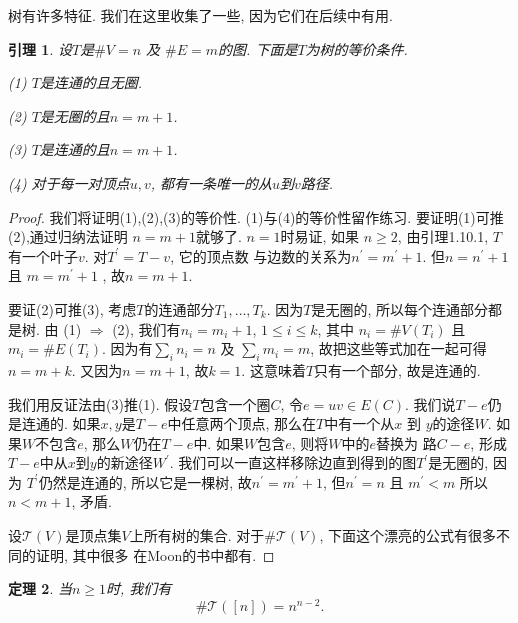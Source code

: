 \documentclass{ctexbook}
\newtheorem{thm}{定理}[section]
\newtheorem{lem}[thm]{引理}
\begin{document}
树有许多特征. 我们在这里收集了一些, 因为它们在后续中有用.
      \begin{lem}
     	设$T$是$\# V=n$ 及 $\# E=m$的图. 下面是$T$为树的等价条件.

     	\noindent(1) $T$是连通的且无圈.

     	\noindent(2) $T$是无圈的且$n=m+1$.

        \noindent(3) $T$是连通的且$n=m+1$.

     	\noindent(4) 对于每一对顶点$u, v$, 都有一条唯一的从$u$到$v$路径.
     \end{lem}
     \begin{proof}
     	我们将证明(1),(2),(3)的等价性. (1)与(4)的等价性留作练习. 要证明(1)可推(2),通过归纳法证明
     	$n=m+1$就够了.  $n=1$时易证, 如果 $n \geqslant 2$, 由引理1.10.1, $T$有一个叶子$v$. 对$T^{\prime}=T-v$, 它的顶点数
     	与边数的关系为$n^{\prime}=m^{\prime}+1$. 但$n=n^{\prime}+1$ 且 $m=m^{\prime}+1$ , 故$n=m+1$.

     	要证(2)可推(3), 考虑$T$的连通部分$T_{1}, \ldots, T_{k}$. 因为$T$是无圈的, 所以每个连通部分都是树. 由
     	(1) $\Longrightarrow$ (2), 我们有$n_{i}=m_{i}+1$, $1 \leqslant i \leqslant k$, 其中 $n_{i}=\# V\left(T_{i}\right)$ 且
     	$m_{i}=\# E\left(T_{i}\right)$. 因为有$\sum_{i} n_{i}=n$ 及 $\sum_{i} m_{i}=m$, 故把这些等式加在一起可得$n=m+k$.
     	又因为$n=m+1$, 故$k=1$. 这意味着$T$只有一个部分, 故是连通的.

     	我们用反证法由(3)推(1). 假设$T$包含一个圈$C$, 令$e=u v \in E(C)$. 我们说$T-e$仍是连通的. 如果$x, y$是$T-e$中任意两个顶点,
     	那么在$T$中有一个从$x$ 到 $y$的途径$W$. 如果$W$不包含$e$, 那么$W$仍在$T-e$中. 如果$W$包含$e$, 则将$W$中的$e$替换为
     	路$C-e$, 形成$T-e$中从$x$到$y$的新途径$W^{\prime}$. 我们可以一直这样移除边直到得到的图$T^{\prime}$是无圈的, 因为
     	$T^{\prime}$仍然是连通的, 所以它是一棵树, 故$n^{\prime}=m^{\prime}+1 $, 但$n^{\prime}=n$ 且 $m^{\prime}<m$
     	所以$n<m+1$, 矛盾. \hfill\qedsymbol

     	设$\mathcal{T}(V)$是顶点集$V$上所有树的集合. 对于$\# \mathcal{T}(V)$, 下面这个漂亮的公式有很多不同的证明, 其中很多
     	在Moon的书中都有.
     \end{proof}
    \begin{thm}
   	当$n \geqslant 1$时, 我们有
   	$$
   	\# \mathcal{T}([n])=n^{n-2}.
   	$$
   \end{thm}
\end{document}
